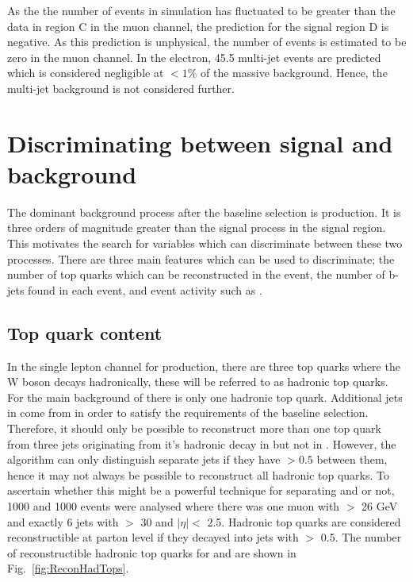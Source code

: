 As the the number of \ttbar events in simulation has fluctuated to be greater than the data in region C in the muon channel, the prediction for the signal region D is negative. As this prediction is unphysical, the number of events is estimated to be zero in the muon channel. In the electron, 45.5 multi-jet events are predicted which is considered negligible at $<1\%$ of the massive \ttbar background. Hence, the multi-jet background is not considered further.

\section{Discriminating between signal and background}
\label{sec:discriminating}
The dominant background process after the baseline selection is \ttbar production. It is three orders of magnitude greater than the \tttt signal process in the signal region. This motivates the search for variables which can discriminate between these two processes. There are three main features which can be used to discriminate; the number of top quarks which can be reconstructed in the event, the number of b-jets found in each event, and event activity such as \HT.

\subsection{Top quark content}
\label{sec:topContent}
In the single lepton channel for \tttt production, there are three top quarks where the W boson decays hadronically, these will be referred to as hadronic top quarks. For the main background of \ttbar there is only one hadronic top quark. Additional jets in \ttbar come from  in order to satisfy the requirements of the baseline selection. Therefore, it should only be possible to reconstruct more than one top quark from three jets originating from it's hadronic decay in \tttt but not in \ttbar. However, the \antikt algorithm can only distinguish separate jets if they have \DR$>0.5$ between them, hence it may not always be possible to reconstruct all hadronic top quarks. To ascertain whether this might be a powerful technique for separating \tttt and \ttbar or not, 1000 \tttt and 1000 \ttbar events were analysed where there was one muon with \PT $>$ 26 GeV and exactly 6 jets with \PT $>$ 30 and $\lvert \eta \rvert<$ 2.5. Hadronic top quarks are considered reconstructible at parton level if they decayed into jets with \DR  $>$  0.5. The number of reconstructible hadronic top quarks for \tttt and \ttbar are shown in Fig.~\ref{fig:ReconHadTops}.

